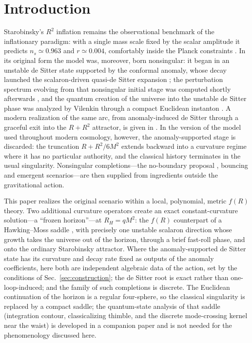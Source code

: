 \documentclass[aps,prd,twocolumn,superscriptaddress,nofootinbib,longbibliography]{revtex4-2}
\begin{document}
\section{Introduction}
\label{sec:intro}
Starobinsky's $R^2$ inflation \cite{Starobinsky1980} remains the observational
benchmark of the inflationary paradigm: with a single mass scale fixed by the
scalar amplitude it predicts $n_s\simeq0.963$ and $r\simeq0.004$, comfortably
inside the Planck constraints \cite{Planck2018X}. In its original form the
model was, moreover, born nonsingular: it began in an unstable de Sitter
state supported by the conformal anomaly, whose decay launched the
scalaron-driven quasi-de Sitter expansion \cite{Starobinsky1980}; the
perturbation spectrum evolving from that nonsingular initial stage was
computed shortly afterwards \cite{Starobinsky1983}, and the quantum creation
of the universe into the unstable de Sitter phase was analyzed by Vilenkin
through a compact Euclidean instanton \cite{Vilenkin1985}. A modern
realization of the same arc, from anomaly-induced de Sitter through a
graceful exit into the $R+R^2$ attractor, is given in \cite{Netto2016}. In
the version of the model used throughout modern cosmology, however, the
anomaly-supported stage is discarded: the truncation $R+R^2/6M^2$ extends
backward into a curvature regime where it has no particular authority, and
the classical history terminates in the usual singularity. Nonsingular
completions---the no-boundary proposal \cite{Lehners2023}, bouncing and
emergent scenarios---are then supplied from ingredients outside the
gravitational action.

This paper realizes the original scenario within a local, polynomial, metric
$f(R)$ theory. Two additional curvature operators create an exact
constant-curvature solution---a ``frozen horizon''---at $R_H=qM^2$: the
$f(R)$ counterpart of a Hawking--Moss saddle \cite{HawkingMoss1982}, with
precisely one unstable scalaron direction whose growth takes the universe
out of the horizon, through a brief fast-roll phase, and onto the ordinary
Starobinsky attractor. Where the anomaly-supported de Sitter state has its
curvature and decay rate fixed as outputs of the anomaly coefficients, here
both are independent algebraic data of the action, set by the conditions of
Sec.~\ref{sec:construction}; the de Sitter root is exact rather than
one-loop-induced; and the family of such completions is discrete. The
Euclidean continuation of the horizon is a regular four-sphere, so the
classical singularity is replaced by a compact saddle; the quantum-state
analysis of that saddle (integration contour, classicalizing thimble, and the
discrete mode-crossing kernel near the waist) is developed in a companion
paper \cite{PandevII} and is not needed for the phenomenology discussed here.
\end{document}
